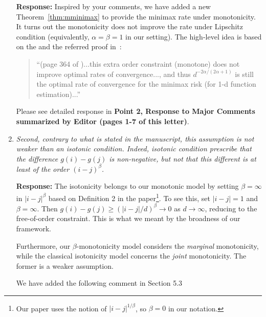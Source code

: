 \documentclass[11pt]{article}
\theoremstyle{plain}
\theoremstyle{definition}
\begin{document}
\begin{enumerate}[wide, labelwidth=!, labelindent=0pt]
     \textbf{Response:} 
Inspired by your comments, we have added a new Theorem~\ref{thm:mminimax} to provide the minimax rate under monotonicity. It turns out the monotonicity does not improve the rate under Lipschitz condition (equivalently, $\alpha=\beta=1$ in our setting). The high-level idea is based on the \citet{mark2002} and the referred proof in~\citet{kiefer1982}:
\begin{quote}
``(page 364 of  \citet{mark2002})...this extra order constraint (monotone) does not improve optimal rates of convergence..., and thus $d^{-2\alpha/(2\alpha+1)}$ is still the optimal rate of convergence for the minimax risk (for 1-d function estimation)...''
\end{quote}

Please see detailed response in \textbf{Point 2, Response to Major Comments summarized by Editor (pages 1-7 of this letter)}.  
          
     \item \textit{Second, contrary to what is stated in the manuscript, this assumption is not weaker than an isotonic condition. Indeed, isotonic condition prescribe that the difference $g(i) - g(j)$ is non-negative, but not that this different is at least of the order $(i - j)^\beta$. }
        
      \textbf{Response: }
      The isotonicity belongs to our monotonic model by setting $\beta=\infty$ in $|i-j|^\beta$ based on Definition 2 in the paper\footnote{Our paper uses the notion of $|i-j|^{1/\beta}$, so $\beta=0$ in our notation.}. To see this, set $|i-j|=1$ and $\beta=\infty$. Then $g(i)-g(j)\geq (|i-j|/d)^\beta\to 0$ as $d\to\infty$, reducing to the free-of-order constraint. This is what we meant by the broadness of our framework. 
      
      Furthermore, our $\beta$-monotonicity model considers the \emph{marginal} monotonicity, while the classical isotonicity model concerns the \emph{joint} monotonicity. The former is a weaker assumption. 
      
      
     We have added the following comment in Section 5.3
\begin{quote}
{\color{blue}


}
\end{quote}
\end{enumerate}
\end{document}
